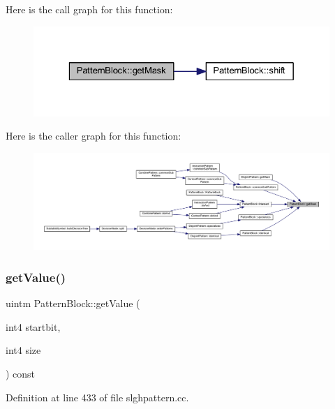 Here is the call graph for this function\+:
\nopagebreak
\begin{figure}[H]
\begin{center}
\leavevmode
\includegraphics[width=329pt]{class_pattern_block_a8e4dd2db9cdde4ebb3d602cdeefefd79_cgraph}
\end{center}
\end{figure}
Here is the caller graph for this function\+:
\nopagebreak
\begin{figure}[H]
\begin{center}
\leavevmode
\includegraphics[width=350pt]{class_pattern_block_a8e4dd2db9cdde4ebb3d602cdeefefd79_icgraph}
\end{center}
\end{figure}
\mbox{\label{class_pattern_block_ae890f0389a7467fedaf982a27fbb84c9}} 
\subsubsection{\texorpdfstring{getValue()}{getValue()}}
{\footnotesize\ttfamily uintm Pattern\+Block\+::get\+Value (\begin{DoxyParamCaption}\item[{int4}]{startbit,  }\item[{int4}]{size }\end{DoxyParamCaption}) const}



Definition at line 433 of file slghpattern.\+cc.

